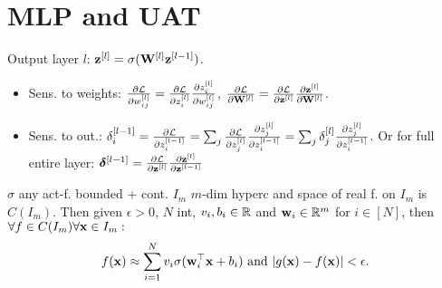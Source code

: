\section{MLP and UAT}
Output layer \(l\): \(\vb{z}^{[l]} = \sigma(\vb{W}^{[l]} \vb{z}^{[l - 1]})\).
\begin{itemize}
    \item Sens. to weights: \(\frac{\partial \mathcal{L}}{\partial w_{ij}^{[l]}} = \frac{\partial \mathcal{L}}{\partial z_i^{[l]}} \frac{\partial z_i^{[l]} }{\partial w_{ij}^{[l]}}\), \(\frac{\partial \mathcal{L}}{\partial \vb{W}^{[l]} } = \frac{\partial \mathcal{L}}{\partial \vb{z}^{[l]} } \frac{\partial \vb{z} ^{[l]}}{\partial \vb{W} ^{[l]}}\).
    \item Sens. to out.: \(\delta_i^{[l-1]} = \frac{\partial \mathcal{L}}{\partial z_i^{[l-1]}} = \sum_j \frac{\partial \mathcal{L}}{\partial z_j^{[l]}} \frac{\partial z_j^{[l]}}{\partial z_i ^{[l-1]}} = \sum_j \delta_j^{[l]} \frac{\partial z_j^{[l]}}{\partial z_i ^{[l-1]}}\).
    Or for full entire layer: \(\vb*{\delta}^{[l-1]} = \frac{\partial \mathcal{L}}{\partial \vb{z} ^{[l]}} \frac{\partial \vb{z}^{[l]}}{\partial \vb{z} ^{[l-1]}}\)
\end{itemize}

\begin{definition}[UAT]
    \(\sigma\) any act-f. bounded + cont. \(I_m\) \(m\)-dim hyperc and space of real f. on \(I_m\) is \(C(I_m)\). Then given \(\epsilon > 0\), \(N\) int, \(v_i, b_i \in \mathbb{R}\) and \(\vb{w}_i \in \mathbb{R}^m\) for \(i \in [N]\), then \(\forall f \in C(I_m) \forall \vb{x} \in I_m:\)
    \[f(\vb{x}) \approx \sum_{i=1}^N v_i \sigma(\vb{w}_i^\top \vb{x} + b_i) \ \text{and} \  \vert g(\vb{x}) - f(\vb{x})\vert < \epsilon.\]
\end{definition}

